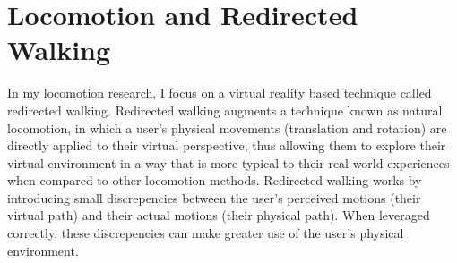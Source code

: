\section*{Locomotion and Redirected Walking}
\vspace{-0.5cm}
In my locomotion research, I focus on a virtual reality based technique called redirected walking. Redirected walking augments a technique known as natural locomotion, in which a user's physical movements (translation and rotation) are directly applied to their virtual perspective, thus allowing them to explore their virtual environment in a way that is more typical to their real-world experiences when compared to other locomotion methods. Redirected walking works by introducing small discrepencies between the user's perceived motions (their virtual path) and their actual motions (their physical path). When leveraged correctly, these discrepencies can make greater use of the user's physical environment.

